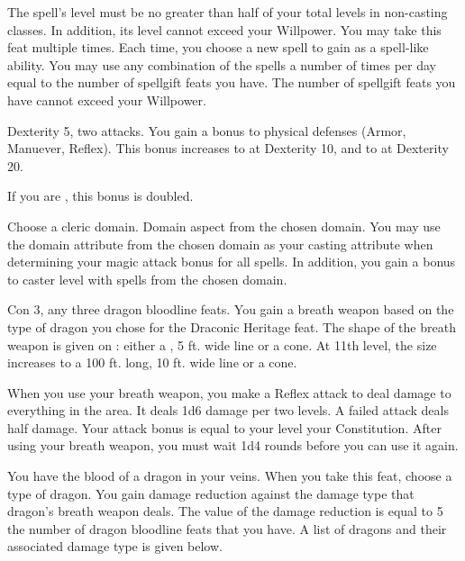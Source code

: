 The spell's level must be no greater than half of your total levels in non-casting classes.
In addition, its level cannot exceed your Willpower.
You may take this feat multiple times.
Each time, you choose a new spell to gain as a spell-like ability.
You may use any combination of the spells a number of times per day equal to the number of spellgift feats you have.
The number of spellgift feats you have cannot exceed your Willpower.

\featpre Dexterity 5, two attacks.
\featben You gain a  bonus to physical defenses (Armor, Manuever, Reflex).
This bonus increases to  at Dexterity 10, and to  at Dexterity 20.

If you are \unencumbered, this bonus is doubled.

Choose a cleric domain.
\featpre Domain aspect from the chosen domain.
\featben You may use the domain attribute from the chosen domain as your casting attribute when determining your magic attack bonus for all spells.
In addition, you gain a  bonus to caster level with spells from the chosen domain.

\featpres
Con 3, any three dragon bloodline feats.
\featben You gain a breath weapon based on the type of dragon you chose for the Draconic Heritage feat.
The shape of the breath weapon is given on : either a \arealarge, 5 ft.
wide line or a \areamed cone.
At 11th level, the size increases to a 100 ft.
long, 10 ft.
wide line or a \arealarge cone.

When you use your breath weapon, you make a Reflex attack to deal damage to everything in the area.
It deals 1d6 damage per two levels.
A failed attack deals half damage.
Your attack bonus is equal to your level \add your Constitution.
After using your breath weapon, you must wait 1d4 rounds before you can use it again.

\featben You have the blood of a dragon in your veins.
When you take this feat, choose a type of dragon.
You gain damage reduction against the damage type that dragon's breath weapon deals.
The value of the damage reduction is equal to 5 \mtimes the number of dragon bloodline feats that you have.
A list of dragons and their associated damage type is given below.

